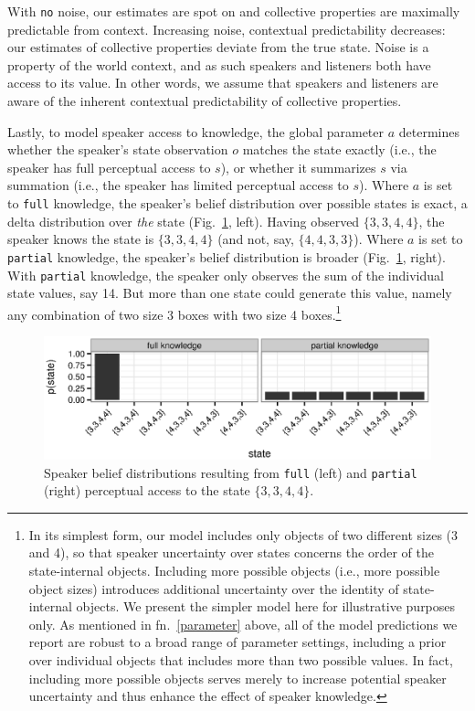 \documentclass[linguex]{sp}
\begin{document}
With \texttt{no} noise, our estimates are spot on and collective properties are maximally predictable from context. Increasing noise, contextual predictability decreases: our estimates of collective properties deviate from the true state. Noise is a property of the world context, and as such speakers and listeners both have access to its value. In other words, we assume that speakers and listeners are aware of the inherent contextual predictability of collective properties.

Lastly, to model speaker access to knowledge, the global parameter $a$ determines whether the speaker's state observation $o$ matches the state exactly (i.e., the speaker has full perceptual access to $s$), or whether it summarizes $s$ via summation (i.e., the speaker has limited perceptual access to $s$). Where $a$ is set to \texttt{full} knowledge, the speaker's belief distribution over possible states is exact, a delta distribution over \emph{the} state (Fig.~\ref{speakerbelief}, left). Having observed $\{3,3,4,4\}$, the speaker knows the state is $\{3,3,4,4\}$ (and not, say, $\{4,4,3,3\}$). Where $a$ is set to \texttt{partial} knowledge, the speaker's belief distribution is broader (Fig.~\ref{speakerbelief}, right). With \texttt{partial} knowledge, the speaker only observes the sum of the individual state values, say 14. But more than one state could generate this value, namely any combination of two size 3 boxes with two size 4 boxes.\footnote{In its simplest form, our model includes only objects of two different sizes (3 and 4), so that speaker uncertainty over states concerns the order of the state-internal objects. Including more possible objects (i.e., more possible object sizes) introduces additional uncertainty over the identity of state-internal objects. We present the simpler model here for illustrative purposes only. As mentioned in fn.~\ref{parameter} above, all of the model predictions we report are robust to a broad range of parameter settings, including a prior over individual objects that includes more than two possible values. In fact, including more possible objects serves merely to increase potential speaker uncertainty and thus enhance the effect of speaker knowledge.}

\begin{figure}[h]
	\includegraphics[width=\linewidth]{plots/state_plots.eps}
	\vspace{-20pt}
	\caption{Speaker belief distributions resulting from \texttt{full} (left) and \texttt{partial} (right) perceptual access to the state $\{3,3,4,4\}$.} \label{speakerbelief}
\end{figure}
\end{document}
